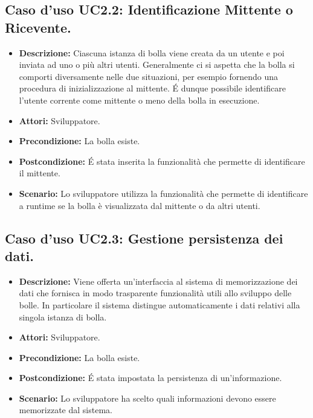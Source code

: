 \subsection{Caso d'uso UC2.2: Identificazione Mittente o Ricevente.}
\begin{itemize}
\item[]\textbf{Descrizione:} Ciascuna istanza di bolla viene creata da un utente e poi inviata ad uno o più altri utenti. Generalmente ci si aspetta che la bolla si comporti diversamente nelle due situazioni, per esempio fornendo una procedura di inizializzazione al mittente. \'E dunque possibile identificare l'utente corrente come mittente o meno della bolla in esecuzione.
\item[]\textbf{Attori:} Sviluppatore. 
\item[]\textbf{Precondizione:} La bolla esiste. 
\item[]\textbf{Postcondizione:} \'E stata inserita la funzionalità che permette di identificare il mittente. 
\item[]\textbf{Scenario:}
Lo sviluppatore utilizza la funzionalità che permette di identificare a runtime se la bolla è visualizzata dal mittente o da altri utenti. 
\end{itemize}

\subsection{Caso d'uso UC2.3: Gestione persistenza dei dati.}
\begin{itemize}
\item[]\textbf{Descrizione:} Viene offerta un'interfaccia al sistema di memorizzazione dei dati che fornisca in modo trasparente funzionalità utili allo sviluppo delle bolle. In particolare il sistema distingue automaticamente i dati relativi alla singola istanza di bolla.
\item[]\textbf{Attori:} Sviluppatore. 
\item[]\textbf{Precondizione:} La bolla esiste. 
\item[]\textbf{Postcondizione:} \'E stata impostata la persistenza di un'informazione. 
\item[]\textbf{Scenario:}
Lo sviluppatore ha scelto quali informazioni devono essere memorizzate dal sistema. 
\end{itemize}

\clearpage

